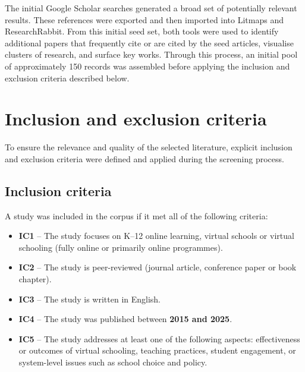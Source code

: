The initial Google Scholar searches generated a broad set of potentially relevant results.
These references were exported and then imported into Litmaps and ResearchRabbit.
From this initial seed set, both tools were used to identify additional papers that frequently cite or are cited by the seed articles, visualise clusters of research, and surface key works.
Through this process, an initial pool of approximately 150 records was assembled before applying the inclusion and exclusion criteria described below.

\section{Inclusion and exclusion criteria}
To ensure the relevance and quality of the selected literature, explicit inclusion and exclusion criteria were defined and applied during the screening process.

\subsection{Inclusion criteria}
A study was included in the corpus if it met all of the following criteria:
\begin{itemize}
    \item \textbf{IC1} -- The study focuses on K--12 online learning, virtual schools or virtual schooling (fully online or primarily online programmes).
    \item \textbf{IC2} -- The study is peer-reviewed (journal article, conference paper or book chapter).
    \item \textbf{IC3} -- The study is written in English.
    \item \textbf{IC4} -- The study was published between \textbf{2015 and 2025}.
    \item \textbf{IC5} -- The study addresses at least one of the following aspects: effectiveness or outcomes of virtual schooling, teaching practices, student engagement, or system-level issues such as school choice and policy.
\end{itemize}

